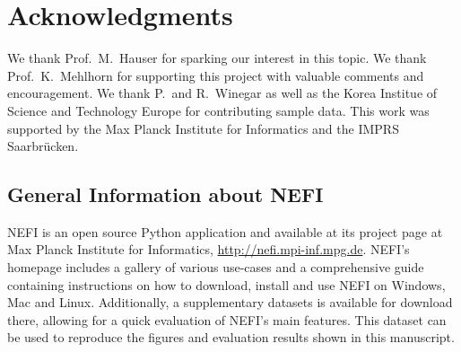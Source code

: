 \section{Acknowledgments}

	We thank Prof.~M.~Hauser for sparking our interest in this topic. We thank Prof.~K.~Mehlhorn for supporting this project with valuable comments and encouragement. We thank P.~and R.~Winegar as well as the Korea Institue of Science and Technology Europe for contributing sample data. This work was supported by the Max Planck Institute for Informatics and the IMPRS Saarbr\"ucken.

\subsection{General Information about NEFI}

    NEFI is an open source Python application and available at its project page at Max Planck Institute for Informatics, \href{http://nefi.mpi-inf.mpg.de}{http://nefi.mpi-inf.mpg.de}. NEFI's homepage includes a gallery of various use-cases and a comprehensive guide containing instructions on how to download, install and use NEFI on Windows, Mac and Linux. Additionally, a supplementary datasets is available for download there, allowing for a quick evaluation of NEFI's main features. This dataset can be used to reproduce the figures and evaluation results shown in this manuscript.







